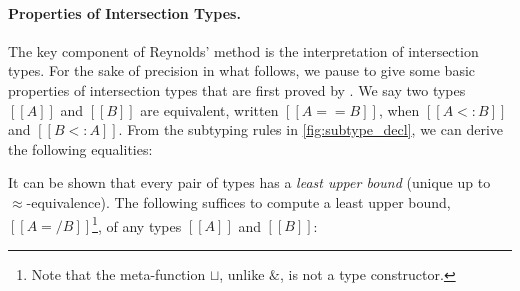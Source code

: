 \paragraph{Properties of Intersection Types.}

The key component of Reynolds' method is the interpretation of intersection
types. For the sake of precision in what follows, we pause to give some basic
properties of intersection types that are first proved by \citet{Reynolds_1991}.
We say two types $[[A]]$ and $[[B]]$ are equivalent, written $[[ A == B ]]$,
when $[[ A <: B ]]$ and $[[B <: A]]$. From the subtyping rules in
\cref{fig:subtype_decl}, we can derive the following equalities:

\begin{proposition}[$[[A == B]]$]\label{prop:1}
\begin{align*}
  [[A1 & (A2 & A3) ]]  &\approx  [[(A1 & A2) & A3]] \\
  [[ Top & A ]] &\approx [[A]] \\
  [[ A & Top ]] &\approx [[A]] \\
  [[A1 & A2 ]]  &\approx  [[ A2 & A1 ]] \\
  [[A & A ]]  &\approx  [[ A ]] \\
  [[ {l : A1 & A2}   ]] &\approx [[  {l : A1}  & {l : A2} ]] \\
  [[  A -> A1 & A2  ]] &\approx [[  (A -> A1) & (A -> A2)   ]] \\
  [[  {l : Top}    ]] &\approx [[  Top   ]] \\
  [[  A -> Top  ]] &\approx [[  Top   ]]
\end{align*}
\end{proposition}

It can be shown that every pair of types has a \textit{least upper bound} (unique up to $\approx$-equivalence). The following suffices to compute a least
upper bound, $[[A =/ B]]$\footnote{Note that the meta-function $\sqcup$, unlike $\&$, is not a type constructor.},
of any types $[[A]]$ and $[[B]]$:




